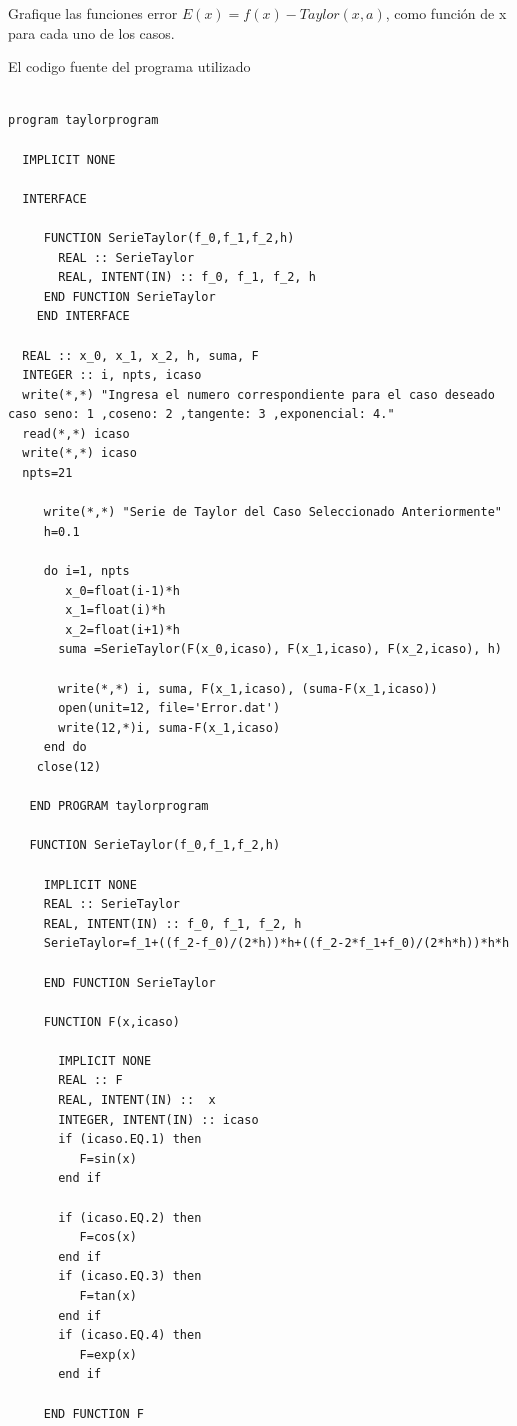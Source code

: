 \documentclass[12pt,a4paper,openright]{article}
\begin{document}
 
 Grafique las funciones error $E(x)= f(x) - Taylor(x,a)$, como función de x para cada uno de los casos. \\
 
\begin{large}
 El codigo fuente del programa utilizado
 \end{large} 
 
\begin{verbatim}

program taylorprogram
  
  IMPLICIT NONE

  INTERFACE
     
     FUNCTION SerieTaylor(f_0,f_1,f_2,h)
       REAL :: SerieTaylor
       REAL, INTENT(IN) :: f_0, f_1, f_2, h
     END FUNCTION SerieTaylor
    END INTERFACE
 
  REAL :: x_0, x_1, x_2, h, suma, F
  INTEGER :: i, npts, icaso  
  write(*,*) "Ingresa el numero correspondiente para el caso deseado caso seno: 1 ,coseno: 2 ,tangente: 3 ,exponencial: 4."
  read(*,*) icaso
  write(*,*) icaso  
  npts=21
    
     write(*,*) "Serie de Taylor del Caso Seleccionado Anteriormente"
     h=0.1
   
     do i=1, npts
        x_0=float(i-1)*h
        x_1=float(i)*h
        x_2=float(i+1)*h
       suma =SerieTaylor(F(x_0,icaso), F(x_1,icaso), F(x_2,icaso), h)
     
       write(*,*) i, suma, F(x_1,icaso), (suma-F(x_1,icaso))               
       open(unit=12, file='Error.dat')
       write(12,*)i, suma-F(x_1,icaso)      
     end do
    close(12)
  
   END PROGRAM taylorprogram   
   
   FUNCTION SerieTaylor(f_0,f_1,f_2,h)
    
     IMPLICIT NONE
     REAL :: SerieTaylor
     REAL, INTENT(IN) :: f_0, f_1, f_2, h
     SerieTaylor=f_1+((f_2-f_0)/(2*h))*h+((f_2-2*f_1+f_0)/(2*h*h))*h*h
    
     END FUNCTION SerieTaylor
    
     FUNCTION F(x,icaso)
      
       IMPLICIT NONE
       REAL :: F
       REAL, INTENT(IN) ::  x
       INTEGER, INTENT(IN) :: icaso
       if (icaso.EQ.1) then
          F=sin(x)
       end if      
  
       if (icaso.EQ.2) then
          F=cos(x)
       end if
       if (icaso.EQ.3) then
          F=tan(x)
       end if
       if (icaso.EQ.4) then
          F=exp(x)
       end if  
     
     END FUNCTION F
     

\end{verbatim} 
\end{document}
